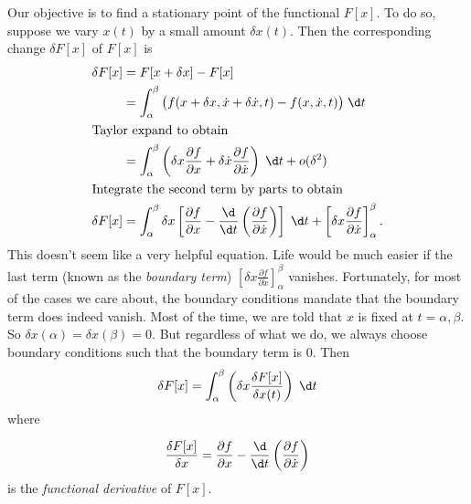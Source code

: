 \documentclass[a4paper]{article}
\begin{document}
Our objective is to find a stationary point of the functional $F[x]$. To do so, suppose we vary $x(t)$ by a small amount $\delta x(t)$. Then the corresponding change $\delta F[x]$ of $F[x]$ is
\begin{align*}
  \delta F[x] &= F[x + \delta x] - F[x]\\
  &= \int_\alpha ^\beta \big(f(x + \delta x, \dot{x} + \delta \dot{x}, t) - f(x, \dot{x}, t)\big)\;\d t\\
  \intertext{Taylor expand to obtain}
  &= \int_\alpha^\beta \left(\delta x\frac{\partial f}{\partial x} + \delta \dot{x} \frac{\partial f}{\partial \dot{x}}\right)\;\d t + o(\delta^2)\\
  \intertext{Integrate the second term by parts to obtain}
  \delta F[x] &= \int_\alpha^\beta\delta x\left[\frac{\partial f}{\partial x} - \frac{\d}{\d t}\left(\frac{\partial f}{\partial \dot{x}}\right)\right]\;\d t + \left[ \delta x\frac{\partial f}{\partial \dot{x}}\right]_\alpha^\beta.
\end{align*}
This doesn't seem like a very helpful equation. Life would be much easier if the last term (known as the \emph{boundary term}) $\left[ \delta x\frac{\partial f}{\partial \dot{x}}\right]_\alpha^\beta$ vanishes. Fortunately, for most of the cases we care about, the boundary conditions mandate that the boundary term does indeed vanish. Most of the time, we are told that $x$ is fixed at $t = \alpha, \beta$. So $\delta x(\alpha) = \delta x(\beta) = 0$. But regardless of what we do, we always choose boundary conditions such that the boundary term is 0. Then
\[
  \delta F[x] = \int_\alpha ^\beta \left(\delta x \frac{\delta F[x]}{\delta x(t)}\right)\;\d t
\]
where
\begin{defi}
  \[
    \frac{\delta F[x]}{\delta x} = \frac{\partial f}{\partial x} - \frac{\d }{\d t}\left(\frac{\partial f}{\partial \dot{x}}\right)
  \]
  is the \emph{functional derivative} of $F[x]$.
\end{defi}
\end{document}
